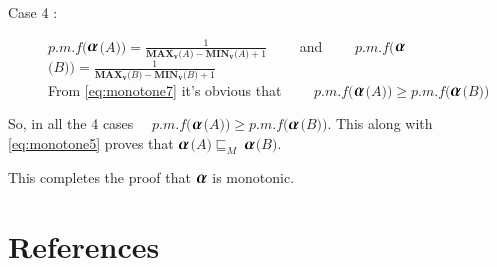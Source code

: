 \documentclass[final,3p, review, times]{util/elsarticle}
\newcommand{\ALPHA}{\large\boldsymbol{\alpha}\normalsize}
\begin{document}
\begin{description}
  \item[Case 4 :] $p.m.f\Big($$\ALPHA$$\big(A\big)\Big)=\displaystyle\frac{1}{\mathbf{MAX_v}\big(A\big)-\mathbf{MIN_v}\big(A\big)+1}\qquad$ and $\qquad p.m.f\Big($$\ALPHA$$\big(B\big)\Big)=\displaystyle\frac{1}{\mathbf{MAX_v}\big(B\big)-\mathbf{MIN_v}\big(B\big)+1}$ \hfill \\
    From \ref{eq:monotone7} it's obvious that $\qquad p.m.f\Big($$\ALPHA$$\big(A\big)\Big)\geq p.m.f\Big($$\ALPHA$$\big(B\big)\Big)$
\end{description}

So, in all the 4 cases $\quad p.m.f\Big($$\ALPHA$$\big(A\big)\Big)\geq p.m.f\Big($$\ALPHA$$\big(B\big)\Big)$. This along with \ref{eq:monotone5} proves that $\ALPHA$$\Big(A\Big)\sqsubseteq_M\ $$\ALPHA$$\Big(B\Big)$.

\noindent This completes the proof that $\ALPHA$ is monotonic.







 
 \section*{References}


\end{document}

